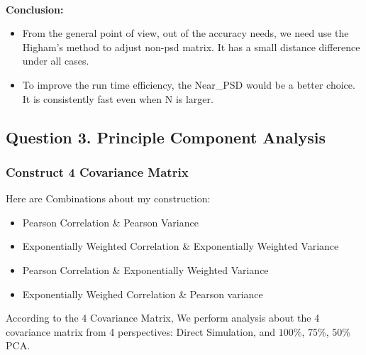 \documentclass[a4paper,12pt]{article}
\begin{document}
\begin{figure}[!htbp]
    \\
\end{figure}

\textbf{Conclusion:}
\begin{itemize}
    \item From the general point of view, out of the accuracy needs, we need use the Higham's method to adjust non-psd matrix. It has a small distance difference under all cases.
    \item To improve the run time efficiency, the Near\_PSD would be a better choice. It is consistently fast even when N is larger. 
\end{itemize}

\newpage
\subsection*{Question 3. Principle Component Analysis}
\subsubsection*{Construct 4 Covariance Matrix}
Here are Combinations about my construction:
\begin{itemize}
    \item Pearson Correlation \& Pearson Variance
    \item Exponentially Weighted Correlation \& Exponentially Weighted Variance
    \item Pearson Correlation \& Exponentially Weighted Variance
    \item Exponentially Weighed Correlation \& Pearson variance
\end{itemize}
According to the 4 Covariance Matrix, We perform analysis about the 4 covariance matrix from 4 perspectives: Direct Simulation, and $100\%$, 75\%, 50\% PCA. \\
\end{document}
